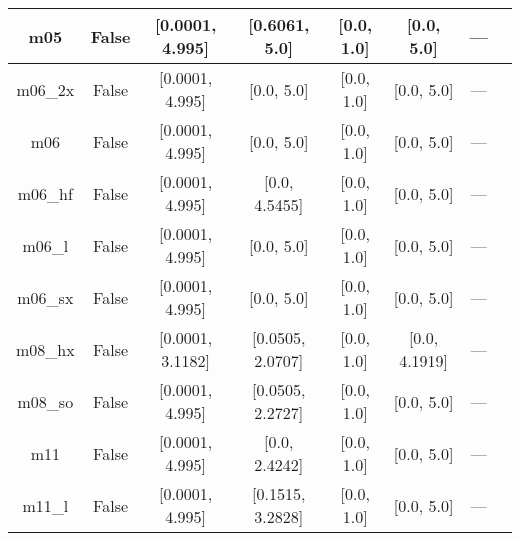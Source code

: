 \begin{tabular}{|c|c|c|c|c|c|c|l|}
           m05 &                 False &   [0.0001, 4.995] &     [0.6061, 5.0] &        [0.0, 1.0] &     [0.0, 5.0] &         --- &                                                              \cite{Zhao2005_161103} \\ \hline
       m06\_2x &                 False &   [0.0001, 4.995] &        [0.0, 5.0] &        [0.0, 1.0] &     [0.0, 5.0] &         --- &                                                                 \cite{Zhao2008_215} \\ \hline
           m06 &                 False &   [0.0001, 4.995] &        [0.0, 5.0] &        [0.0, 1.0] &     [0.0, 5.0] &         --- &                                                                 \cite{Zhao2008_215} \\ \hline
       m06\_hf &                 False &   [0.0001, 4.995] &     [0.0, 4.5455] &        [0.0, 1.0] &     [0.0, 5.0] &         --- &                                                               \cite{Zhao2006_13126} \\ \hline
        m06\_l &                 False &   [0.0001, 4.995] &        [0.0, 5.0] &        [0.0, 1.0] &     [0.0, 5.0] &         --- &                                                 \cite{Zhao2006_194101,Zhao2008_215} \\ \hline
       m06\_sx &                 False &   [0.0001, 4.995] &        [0.0, 5.0] &        [0.0, 1.0] &     [0.0, 5.0] &         --- &                                                                \cite{Wang2020_2294} \\ \hline
       m08\_hx &                 False &  [0.0001, 3.1182] &  [0.0505, 2.0707] &        [0.0, 1.0] &  [0.0, 4.1919] &         --- &                                                                \cite{Zhao2008_1849} \\ \hline
       m08\_so &                 False &   [0.0001, 4.995] &  [0.0505, 2.2727] &        [0.0, 1.0] &     [0.0, 5.0] &         --- &                                                                \cite{Zhao2008_1849} \\ \hline
           m11 &                 False &   [0.0001, 4.995] &     [0.0, 2.4242] &        [0.0, 1.0] &     [0.0, 5.0] &         --- &                                                            \cite{Peverati2011_2810} \\ \hline
        m11\_l &                 False &   [0.0001, 4.995] &  [0.1515, 3.2828] &        [0.0, 1.0] &     [0.0, 5.0] &         --- &                                                             \cite{Peverati2012_117} \\ \hline

\end{tabular}
